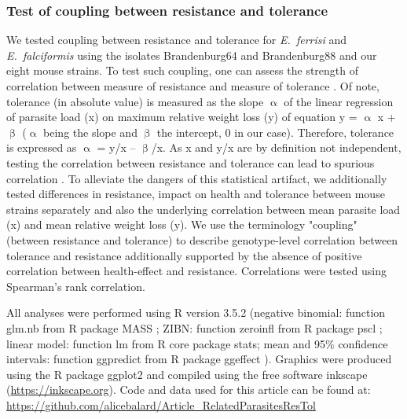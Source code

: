 \documentclass[12pt]{article}
\begin{document}
\subsubsection{Test of coupling between resistance and tolerance}

We tested coupling between resistance and tolerance for \textit{E.~ferrisi} and \textit{E.~falciformis }using the isolates Brandenburg64 and Brandenburg88 and our eight mouse strains. To test such coupling, one can assess the strength of correlation between measure of resistance and measure of tolerance \citep{raaberg_disentangling_2007}. Of note, tolerance (in absolute value) is measured as the slope $\upalpha$ of the linear regression of parasite load (x) on maximum relative weight loss (y) of equation y = $\upalpha$ x + $\upbeta$ ($\upalpha$ being the slope and $\upbeta$ the intercept, 0 in our case). Therefore, tolerance is expressed as $\upalpha$ = y/x – $\upbeta$/x. As x and y/x are by definition not independent, testing the correlation between resistance and tolerance can lead to spurious correlation \citep{Brett2004}. To alleviate the dangers of this statistical artifact, we additionally tested differences in resistance, impact on health and tolerance between mouse strains separately and also the underlying correlation between mean parasite load (x) and mean relative weight loss (y). We use the terminology "coupling" (between resistance and tolerance) to describe genotype-level correlation between tolerance and resistance additionally supported by the absence of positive correlation between health-effect and resistance. Correlations were tested using Spearman’s rank correlation.\par

All analyses were performed using R version 3.5.2 \citep{R_2010}(negative binomial: function glm.nb from R package MASS \citep{venables_modern_2002}; ZIBN: function zeroinfl from R package pscl \citep{Jackman2020, Zeileis2008}; linear model: function lm from R core package stats; mean and 95\% confidence intervals: function ggpredict from R package ggeffect \citep{Ldecke2018}). Graphics were prod\textcolor[HTML]{00000A}{uced using the R package ggplot2 \citep{wickham_ggplot2_2016} and compiled using the free software inkscape (\href{https://inkscape.org/}{https://inkscape.org}). Code and data used for this article can be found at: \href{https://github.com/alicebalard/Article_RelatedParasitesResTol}{https://github.com/alicebalard/Article\_RelatedParasitesResTol}}\par
\end{document}
